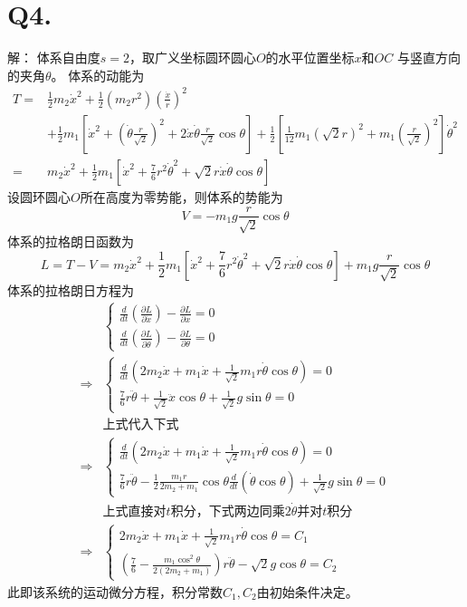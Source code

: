 \documentclass[10pt,a4paper]{article}
\begin{document}
\section*{Q4.}解：
体系自由度$s=2$，取广义坐标圆环圆心$O$的水平位置坐标$x$和$OC$ 与竖直方向的夹角$\theta$。
体系的动能为
\begin{align*}
T =&\frac{1}{2}m_2\dot{x}^2+\frac{1}{2}(m_2r^2)(\frac{\dot{x}}{r})^2\\
&+\frac{1}{2}m_1[\dot{x}^2+(\dot{\theta}\frac{r}{\sqrt{2}})^2+2\dot{x}\dot{\theta}\frac{r}{\sqrt{2}}\cos\theta]+\frac{1}{2}[\frac{1}{12}m_1(\sqrt{2}r)^2+m_1(\frac{r}{\sqrt{2}})^2]\dot{\theta}^2\\
=&m_2\dot{x}^2+\frac{1}{2}m_1[\dot{x}^2+\frac{7}{6}r^2\dot{\theta}^2+\sqrt{2}r\dot{x}\dot{\theta}\cos\theta]
\end{align*}
设圆环圆心$O$所在高度为零势能，则体系的势能为
\[
V = -m_1g\frac{r}{\sqrt{2}}\cos\theta
\]
体系的拉格朗日函数为
\[
L = T-V = m_2\dot{x}^2+\frac{1}{2}m_1[\dot{x}^2+\frac{7}{6}r^2\dot{\theta}^2+\sqrt{2}r\dot{x}\dot{\theta}\cos\theta]+m_1g\frac{r}{\sqrt{2}}\cos\theta
\]
体系的拉格朗日方程为
\begin{align*}
&\left\{\begin{array}{ll}
\frac{d}{dt}(\frac{\partial L}{\partial\dot{x}})-\frac{\partial L}{\partial x} = 0\\
\frac{d}{dt}(\frac{\partial L}{\partial\dot{\theta}})-\frac{\partial L}{\partial \theta} = 0
\end{array}\right.\\
\Longrightarrow&\left\{\begin{array}{ll}
\frac{d}{dt}(2m_2\dot{x}+m_1\dot{x}+\frac{1}{\sqrt{2}}m_1r\dot{\theta}\cos\theta) = 0\\
\frac{7}{6}r\ddot{\theta}+\frac{1}{\sqrt{2}}\ddot{x}\cos\theta+\frac{1}{\sqrt{2}}g\sin\theta = 0
\end{array}\right.\\
&\text{上式代入下式}\\
\Longrightarrow&\left\{\begin{array}{ll}
\frac{d}{dt}(2m_2\dot{x}+m_1\dot{x}+\frac{1}{\sqrt{2}}m_1r\dot{\theta}\cos\theta) = 0\\
\frac{7}{6}r\ddot{\theta}-\frac{1}{2}\frac{m_1r}{2m_2+m_1}\cos\theta\frac{d}{dt}(\dot{\theta}\cos\theta)+\frac{1}{\sqrt{2}}g\sin\theta = 0
\end{array}\right.\\
&\text{上式直接对$t$积分，下式两边同乘$2\dot{\theta}$并对$t$积分}\\
\Longrightarrow&\left\{\begin{array}{ll}
2m_2\dot{x}+m_1\dot{x}+\frac{1}{\sqrt{2}}m_1r\dot{\theta}\cos\theta = C_1\\
(\frac{7}{6}-\frac{m_1\cos^2\theta}{2(2m_2+m_1)})r\ddot{\theta}-\sqrt{2}g\cos\theta = C_2
\end{array}\right.
\end{align*}
此即该系统的运动微分方程，积分常数$C_1,C_2$由初始条件决定。
\end{document}
